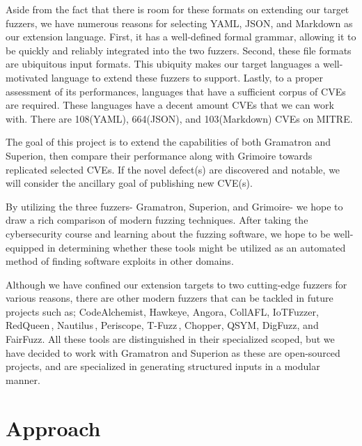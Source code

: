 \documentclass[12pt]{diazessay}
\begin{document}
Aside from the fact that there is room for these formats on extending our target fuzzers, we have numerous reasons for selecting YAML, JSON, and Markdown as our extension language.
First, it has a well-defined formal grammar, allowing it to be quickly and reliably integrated into the two fuzzers.
Second, these file formats are ubiquitous input formats.
This ubiquity makes our target languages a well-motivated language to extend these fuzzers to support.
Lastly, to a proper assessment of its performances, languages that have a sufficient corpus of CVEs are required. 
These languages have a decent amount CVEs that we can work with.
There are 108(YAML), 664(JSON), and 103(Markdown) CVEs on MITRE\cite{MITRE}.

The goal of this project is to extend the capabilities of both Gramatron and Superion, then compare their performance along with Grimoire towards replicated selected CVEs.
If the novel defect(s) are discovered and notable, we will consider the ancillary goal of publishing new CVE(s).

By utilizing the three fuzzers- Gramatron, Superion, and Grimoire- we hope to draw a rich comparison of modern fuzzing techniques.
After taking the cybersecurity course and learning about the fuzzing software, we hope to be well-equipped in determining whether these tools might be utilized as an automated method of finding software exploits in other domains.

Although we have confined our extension targets to two cutting-edge fuzzers for various reasons, 
there are other modern fuzzers that can be tackled in future projects such as; CodeAlchemist\cite{CodeAlchemist1}\cite{CodeAlchemist2}, Hawkeye\cite{Hawkeye}, Angora\cite{Angora1}\cite{Angora2}, CollAFL\cite{CollAFL}, IoTFuzzer\cite{IoTFuzzer}, RedQueen\,\cite{redqueen}, Nautilus\,\cite{Nautilus1}\cite{Nautilus2}, Periscope\cite{PeriScope1}\cite{PeriScope2}, T-Fuzz\,\cite{TFuzz1}\cite{TFuzz2}, Chopper\cite{Chopper}, QSYM\cite{QSYM1}\cite{QSYM2}, DigFuzz\cite{DigFuzz}, and FairFuzz\cite{FairFuzz1}\cite{FairFuzz2}.
All these tools are distinguished in their specialized scoped, but we have decided to work with Gramatron and Superion as these are open-sourced projects, and are specialized in generating structured inputs in a modular manner.

\vspace{3mm}
\section*{Approach}
\end{document}
